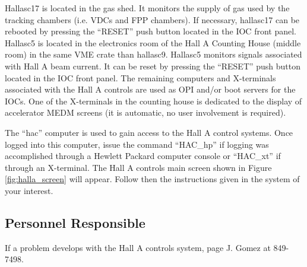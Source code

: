 Hallasc17 is located in the gas shed.
It monitors the supply of gas used by the tracking chambers (i.e. VDCs and FPP chambers).
If necessary, hallasc17 can be rebooted by pressing the ``RESET'' push button located in the IOC front panel.
Hallasc5 is located in the electronics room of the Hall A Counting House (middle room) in the same VME crate than hallasc9.
Hallasc5 monitors signals associated with Hall A beam current. It can be reset by pressing the ``RESET'' push button located in the
IOC front panel. The remaining computers and X-terminals associated with the Hall A controls are used as OPI and/or boot servers for the
IOCs. One of the X-terminals in the counting house is dedicated to the display of accelerator MEDM screens 
(it is automatic, no user involvement is required).

The ``hac'' computer is used to gain access to the Hall A control systems. Once logged into this computer, issue the command ``HAC\_hp''
if logging was accomplished through a Hewlett Packard computer console or ``HAC\_xt'' if through an X-terminal.
The Hall A controls main screen shown in Figure \ref{fig:halla_screen} will appear. Follow then the instructions given in the system of your interest.


\subsection{Personnel Responsible}
If a problem develops with the Hall A controls system, page J. Gomez at 849-7498. 


%
%
%
%
